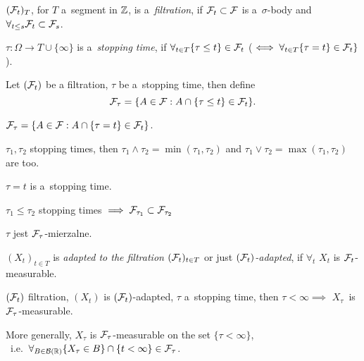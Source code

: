



	\begin{definition}[filtration]
		$(\mathcal{F}_t)_T$, for $T$ a~segment in ${\mathbb{Z}}$, is a~\emph{filtration},
		if $\mathcal{F}_t \subset \mathcal{F}$ is a~$\sigma$-body and $\forall_{t \leq s} \mathcal{F}_t \subset \mathcal{F}_s$.
	\end{definition}
	
	\begin{definition}
		$\tau: \Omega \to T \cup \{\infty\}$ is a~\emph{stopping time}, if
		$\forall_{t \in T} \{\tau \leq t\} \in \mathcal{F}_t$
		($\iff \forall_{t \in T} \{ \tau = t\} \in \mathcal{F}_t\}$).
	\end{definition}
	
	\begin{definition}
		Let $(\mathcal{F}_t)$ be a filtration, $\tau$ be a~stopping time, then define
		$$\mathcal{F}_\tau = \{ A \in \mathcal{F}: A \cap \{ \tau \leq t\} \in \mathcal{F}_t\}.$$
	\end{definition}
	
	\begin{proposition}
		$\mathcal{F}_\tau = \{ A \in \mathcal{F}: A \cap \{ \tau = t \} \in \mathcal{F}_t\}$.
	\end{proposition}
	
	\begin{proposition}
		$\tau_1, \tau_2$ stopping times, then $\tau_1 \wedge \tau_2 = \min(\tau_1, \tau_2)$
		and $\tau_1 \vee \tau_2 = \max(\tau_1, \tau_2)$ are too.
		
		$\tau = t$ is a~stopping time.
		
		$\tau_1 \leq \tau_2$ stopping times $\implies \mathcal{F}_{\tau_1} \subset \mathcal{F}_{\tau_2}$
		
		$\tau$ jest $\mathcal{F}_\tau$-mierzalne.
	\end{proposition}
	
	\begin{definition}
		$(X_t)_{t \in T}$ is \emph{adapted to the filtration} $(\mathcal{F}_t)_{t \in T}$ or just \mbox{\emph{$(\mathcal{F}_t)$-adapted}}, if $\forall_t$ $X_t$ is $\mathcal{F}_t$-measurable.
	\end{definition}
	
	\begin{proposition}
		$(\mathcal{F}_t)$ filtration, $(X_t)$ is $(\mathcal{F}_t)$-adapted, $\tau$ a~stopping time,
		then $\tau < \infty \implies$ \mbox{$X_\tau$ is $\mathcal{F}_\tau$-measurable}.
		
		More generally, $X_\tau$ is $\mathcal{F}_\tau$-measurable on the set $\{\tau < \infty\}$, \\ \mbox{
		i.e. $\forall_{B \in \mathcal{B}(\mathbb{R})} \{X_\tau \in B\} \cap \{t < \infty\} \in \mathcal{F}_\tau$.}
	\end{proposition}
	
